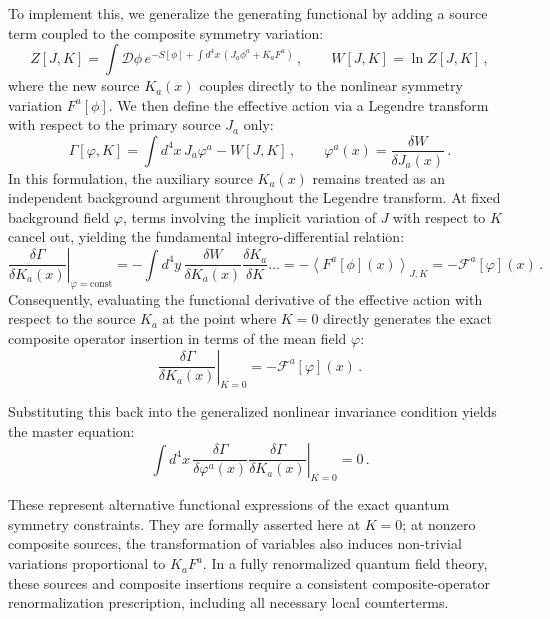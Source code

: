 To implement this, we generalize the generating functional by adding a source term coupled to the composite symmetry variation:
\begin{equation} \label{eq:composite_source_Z_W}
    Z[J, K] = \int \mathcal{D}\phi \, e^{-S[\phi] + \int d^4x \, (J_a \phi^a + K_a F^a)} \, , \qquad W[J, K] = \ln Z[J, K] \, ,
\end{equation}
where the new source \(K_a(x)\) couples directly to the nonlinear symmetry variation \(F^a[\phi]\). We then define the effective action via a Legendre transform with respect to the primary source \(J_a\) only:
\begin{equation} \label{eq:composite_source_Gamma}
    \Gamma[\varphi, K] = \int d^4x \, J_a \varphi^a - W[J, K] \, , \qquad \varphi^a(x) = \frac{\delta W}{\delta J_a(x)} \, .
\end{equation}
In this formulation, the auxiliary source \(K_a(x)\) remains treated as an independent background argument throughout the Legendre transform. At fixed background field \(\varphi\), terms involving the implicit variation of \(J\) with respect to \(K\) cancel out, yielding the fundamental integro-differential relation:
\begin{equation} \label{eq:gamma_K_derivative_relation}
    \left. \frac{\delta \Gamma}{\delta K_a(x)} \right|_{\varphi = \text{const}} = - \int d^4y \, \frac{\delta W}{\delta K_a(x)} \frac{\delta K_a}{\delta K} \dots = -\left\langle F^a[\phi](x) \right\rangle_{J,K} = -\mathcal{F}^a[\varphi](x) \, .
\end{equation}
Consequently, evaluating the functional derivative of the effective action with respect to the source \(K_a\) at the point where \(K = 0\) directly generates the exact composite operator insertion in terms of the mean field \(\varphi\):
\begin{equation} \label{eq:composite_source_master_identity}
    \left. \frac{\delta \Gamma}{\delta K_a(x)} \right|_{K=0} = -\mathcal{F}^a[\varphi](x) \, .
\end{equation}

Substituting this back into the generalized nonlinear invariance condition yields the master equation:
\begin{equation} \label{eq:master_composite_ward}
    \int d^4x \, \frac{\delta \Gamma}{\delta \varphi^a(x)} \left. \frac{\delta \Gamma}{\delta K_a(x)} \right|_{K=0} = 0 \, .
\end{equation}

These represent alternative functional expressions of the exact quantum symmetry constraints. They are formally asserted here at \(K = 0\); at nonzero composite sources, the transformation of variables also induces non-trivial variations proportional to \(K_a F^a\). In a fully renormalized quantum field theory, these sources and composite insertions require a consistent composite-operator renormalization prescription, including all necessary local counterterms.

